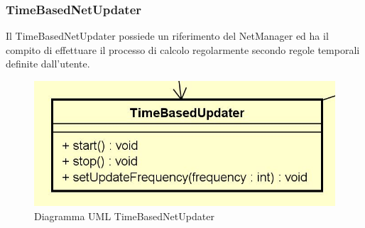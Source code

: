 \subsubsection{TimeBasedNetUpdater}
Il TimeBasedNetUpdater possiede un riferimento del NetManager ed ha il compito di effettuare il processo di calcolo regolarmente secondo regole temporali definite dall'utente.
\begin{figure} [H]
	\centering
		\includegraphics[scale=0.8]{Img/TimeBasedUpdater}
	\caption{Diagramma UML TimeBasedNetUpdater}\label{}
\end{figure}

